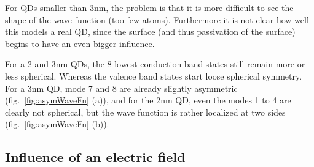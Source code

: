 For QDs smaller than 3nm, the problem is that it is more difficult to see the shape of the wave function (too few atoms). Furthermore it is not clear how well this models a real QD, since the surface (and thus passivation of the surface) begins to have an even bigger influence.
	
For a 2 and 3nm QDs, the 8 lowest conduction band states still remain more or less spherical. Whereas the valence band states start loose spherical symmetry. For a 3nm QD, mode 7 and 8 are already slightly asymmetric (fig.~\ref{fig:asymWaveFn} (a)), and for the 2nm QD, even the modes 1 to 4 are clearly not spherical, but the wave function is rather localized at two sides (fig.~\ref{fig:asymWaveFn} (b)).
	
\FloatBarrier
\subsection{Influence of an electric field}

